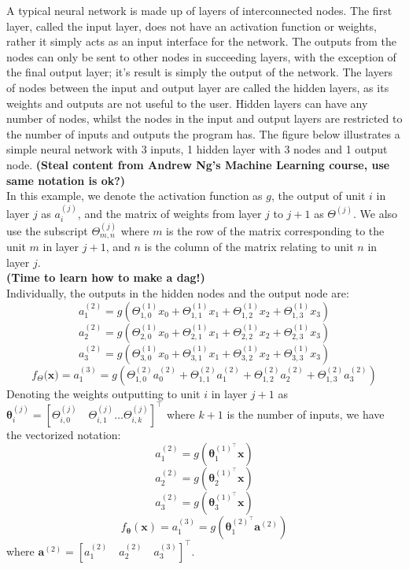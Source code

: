 \documentclass[a4paper,12pt]{article}
\begin{document}
A typical neural network is made up of layers of interconnected nodes. The first layer, called the input layer, does not have an activation function or weights, rather it simply acts as an input interface for the network. The outputs from the nodes can only be sent to other nodes in succeeding layers, with the exception of the final output layer; it's result is simply the output of the network. The layers of nodes between the input and output layer are called the hidden layers, as its weights and outputs are not useful to the user. Hidden layers can have any number of nodes, whilst the nodes in the input and output layers are restricted to the number of inputs and outputs the program has. The figure below illustrates a simple neural network with 3 inputs, 1 hidden layer with 3 nodes and 1 output node. \textbf{(Steal content from Andrew Ng's Machine Learning course, use same notation is ok?)}\\
In this example, we denote the activation function as $g$, the output of unit $i$ in layer $j$ as $a^{(j)}_i$, and the matrix of weights from layer $j$ to $j+1$ as $\Theta^{(j)}$. We also use the subscript $\Theta^{(j)}_{m,n}$ where $m$ is the row of the matrix corresponding to the unit $m$ in layer $j+1$, and $n$ is the column of the matrix relating to unit $n$ in layer $j$.\\
\textbf{(Time to learn how to make a dag!)}\\
Individually, the outputs in the hidden nodes and the output node are:
\[a_1^{(2)}=g(\Theta^{(1)}_{1,0}x_0+\Theta^{(1)}_{1,1}x_1+\Theta^{(1)}_{1,2}x_2+\Theta^{(1)}_{1,3}x_3)\]
\[a_2^{(2)}=g(\Theta^{(1)}_{2,0}x_0+\Theta^{(1)}_{2,1}x_1+\Theta^{(1)}_{2,2}x_2+\Theta^{(1)}_{2,3}x_3)\]
\[a_3^{(2)}=g(\Theta^{(1)}_{3,0}x_0+\Theta^{(1)}_{3,1}x_1+\Theta^{(1)}_{3,2}x_2+\Theta^{(1)}_{3,3}x_3)\]
\[f_\Theta(\bm{x)}=a_1^{(3)}=g(\Theta^{(2)}_{1,0}a_0^{(2)}+\Theta^{(2)}_{1,1}a_1^{(2)}+\Theta^{(2)}_{1,2}a_2^{(2)}+\Theta^{(2)}_{1,3}a_3^{(2)})\]
Denoting the weights outputting to unit $i$ in layer $j+1$ as $\bm{\theta}^{(j)}_i = [\Theta_{i,0}^{(j)}\quad \Theta_{i,1}^{(j)}\dots \Theta_{i,k}^{(j)}]^\top$ where $k+1$ is the number of inputs, we have the vectorized notation:
\[a_1^{(2)}=g(\bm{\theta}^{(1)^\top}_1\bm{x})\]
\[a_2^{(2)}=g(\bm{\theta}^{(1)^\top}_2\bm{x})\]
\[a_3^{(2)}=g(\bm{\theta}^{(1)^\top}_3\bm{x})\]
\[f_{\bm{\theta}}(\bm{x})=a_1^{(3)}=g(\bm{\theta}_1^{(2)^\top}\bm{a}^{(2)})\] 
where $\bm{a}^{(2)}=[a_1^{(2)}\quad a_2^{(2)}\quad a_3^{(3)}]^\top$.
\end{document}
